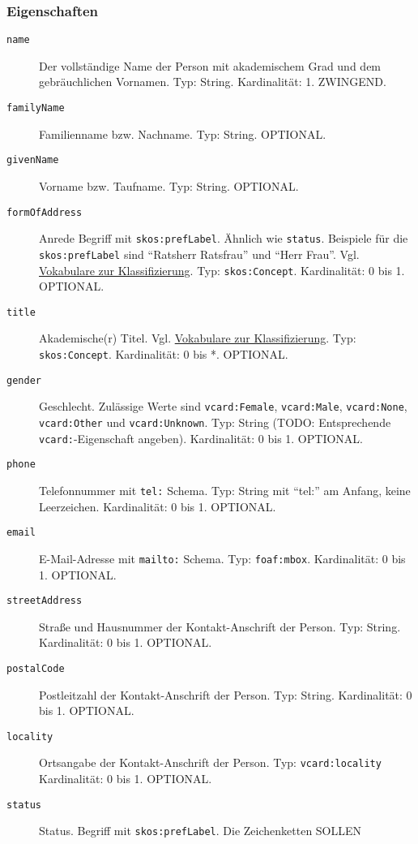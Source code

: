 \documentclass[,a4paper]{article}
\begin{document}
\subsubsection{Eigenschaften}\label{eigenschaften-3}

\begin{description}
\item[\texttt{name}]
Der vollständige Name der Person mit akademischem Grad und dem
gebräuchlichen Vornamen. Typ: String. Kardinalität: 1. ZWINGEND.
\item[\texttt{familyName}]
Familienname bzw. Nachname. Typ: String. OPTIONAL.
\item[\texttt{givenName}]
Vorname bzw. Taufname. Typ: String. OPTIONAL.
\item[\texttt{formOfAddress}]
Anrede Begriff mit \texttt{skos:prefLabel}. Ähnlich wie \texttt{status}.
Beispiele für die \texttt{skos:prefLabel} sind ``Ratsherr \textbar{}
Ratsfrau'' und ``Herr \textbar{} Frau''. Vgl.
\hyperref[vokabulareux5fklassifizierung]{Vokabulare zur
Klassifizierung}. Typ: \texttt{skos:Concept}. Kardinalität: 0 bis 1.
OPTIONAL.
\item[\texttt{title}]
Akademische(r) Titel. Vgl.
\hyperref[vokabulareux5fklassifizierung]{Vokabulare zur
Klassifizierung}. Typ: \texttt{skos:Concept}. Kardinalität: 0 bis *.
OPTIONAL.
\item[\texttt{gender}]
Geschlecht. Zulässige Werte sind \texttt{vcard:Female},
\texttt{vcard:Male}, \texttt{vcard:None}, \texttt{vcard:Other} und
\texttt{vcard:Unknown}. Typ: String (TODO: Entsprechende
\texttt{vcard:}-Eigenschaft angeben). Kardinalität: 0 bis 1. OPTIONAL.
\item[\texttt{phone}]
Telefonnummer mit \texttt{tel:} Schema. Typ: String mit ``tel:'' am
Anfang, keine Leerzeichen. Kardinalität: 0 bis 1. OPTIONAL.
\item[\texttt{email}]
E-Mail-Adresse mit \texttt{mailto:} Schema. Typ: \texttt{foaf:mbox}.
Kardinalität: 0 bis 1. OPTIONAL.
\item[\texttt{streetAddress}]
Straße und Hausnummer der Kontakt-Anschrift der Person. Typ: String.
Kardinalität: 0 bis 1. OPTIONAL.
\item[\texttt{postalCode}]
Postleitzahl der Kontakt-Anschrift der Person. Typ: String.
Kardinalität: 0 bis 1. OPTIONAL.
\item[\texttt{locality}]
Ortsangabe der Kontakt-Anschrift der Person. Typ:
\texttt{vcard:locality} Kardinalität: 0 bis 1. OPTIONAL.
\item[\texttt{status}]
Status. Begriff mit \texttt{skos:prefLabel}. Die Zeichenketten SOLLEN

\end{description}
\end{document}
